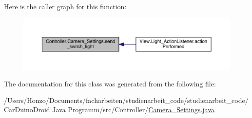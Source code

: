 Here is the caller graph for this function\+:
\nopagebreak
\begin{figure}[H]
\begin{center}
\leavevmode
\includegraphics[width=350pt]{class_controller_1_1_camera___settings_aa8a94837c96e3f9c0291b14d921f29bc_icgraph}
\end{center}
\end{figure}




The documentation for this class was generated from the following file\+:\begin{DoxyCompactItemize}
\item 
/\+Users/\+Honzo/\+Documents/facharbeiten/studienarbeit\+\_\+code/studienarbeit\+\_\+code/\+Car\+Duino\+Droid Java Programm/src/\+Controller/\hyperlink{_camera___settings_8java}{Camera\+\_\+\+Settings.\+java}\end{DoxyCompactItemize}
